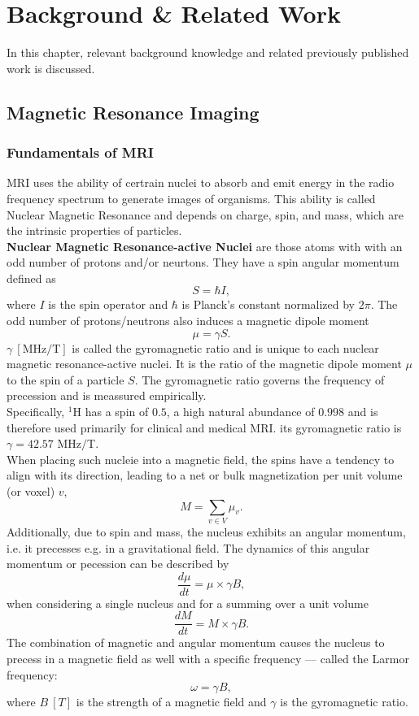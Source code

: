 \chapter{Background \& Related Work}
In this chapter, relevant background knowledge and related previously published work is discussed.

\section{Magnetic Resonance Imaging}
\subsection{Fundamentals of MRI}
MRI uses the ability of certrain nuclei to absorb and emit energy in the radio frequency spectrum to generate images of organisms.
This ability is called Nuclear Magnetic Resonance and depends on charge, spin, and mass, which are the intrinsic properties of particles. \\
\textbf{Nuclear Magnetic Resonance-active Nuclei} are those atoms with  with an odd number of protons and/or neurtons\autocite{nishimura, halliday}.
They have a spin angular momentum defined as
\[ S = \hbar I, \]
where $I$ is the spin operator and $\hbar$ is Planck's constant normalized by $2\pi$.
The odd number of protons/neutrons also induces a magnetic dipole moment
\[ \mu = \gamma S. \]
$\gamma \ [\text{MHz} / \text{T}]$ is called the gyromagnetic ratio and is unique to each nuclear magnetic resonance-active nuclei.
It is the ratio of the magnetic dipole moment $\mu$ to the spin of a particle $S$.
The gyromagnetic ratio governs the frequency of precession and is meassured empirically. \\
Specifically, ${}^1$H has a spin of $0.5$, a high natural abundance of $0.998$ and is therefore used primarily for clinical and medical MRI.
its gyromagnetic ratio is $\gamma = 42.57$ MHz$/$T.\\
When placing such nucleie into a magnetic field, the spins have a tendency to align with its direction, leading to a net or bulk magnetization per unit volume (or voxel) $v$,
\[ M = \sum_{v \in V} \mu_v. \]
Additionally, due to spin and mass, the nucleus exhibits an angular momentum, i.e. it precesses e.g. in a gravitational field.
The dynamics of this angular momentum  or pecession can be described by
\[ \frac{d \mu}{d t} = \mu \times \gamma B, \]
when considering a single nucleus and for a summing over a unit volume
\[ \frac{d M}{d t} = M \times \gamma B. \]
The combination of magnetic and angular momentum causes the nucleus to precess in a magnetic field as well with a specific frequency --- called the Larmor frequency:
\[ \omega = \gamma B, \]
where $B \ [T]$ is the strength of a magnetic field and $\gamma$ is the gyromagnetic ratio.

